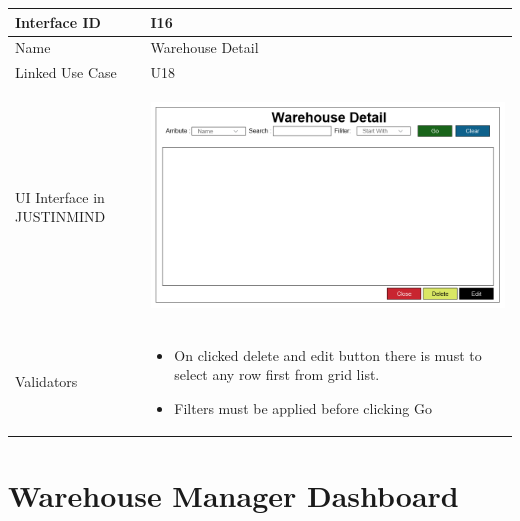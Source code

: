 \documentclass[12pt,a4paper]{report}
\begin{document}
\begin{tabular}{ | m{3cm} | m{12cm}| } \hline

Interface ID & I16  \\\hline

Name  &  Warehouse Detail \\ \hline

Linked Use Case & U18 \\ \hline

UI Interface in JUSTINMIND & \begin{center} \includegraphics[scale=0.3]{./User Interface/UI-015 ViewAndDelete Warehouse@.png}\end{center}  \\ \hline

Validators & 
\begin{itemize}
\item   On clicked delete and edit button there is must to select any row first from grid list. 
\item  Filters must be applied before clicking Go


\end{itemize}
\\ \hline

\end{tabular} 
\section{Warehouse Manager Dashboard }
\end{document}
